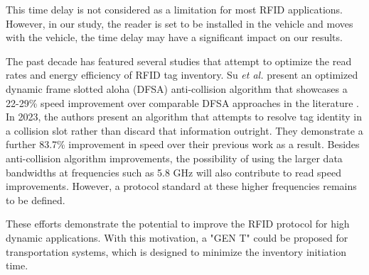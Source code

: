 \documentclass[lettersize,journal]{IEEEtran}
\begin{document}
This time delay is not considered as a limitation for most RFID applications. However, in our study, the reader is set to be installed in the vehicle and moves with the vehicle, the time delay may have a significant impact on our results. 

The past decade has featured several studies that attempt to optimize the read rates and energy efficiency of RFID tag inventory. Su \textit{et al.} present an optimized dynamic frame slotted aloha (DFSA) anti-collision algorithm that showcases a 22-29\% speed improvement over comparable DFSA approaches in the literature \cite{su2020}. In 2023, the authors present an algorithm that attempts to resolve tag identity in a collision slot rather than discard that information outright. They demonstrate a further 83.7\% improvement in speed over their previous work \cite{su2023} as a result. Besides anti-collision algorithm improvements, the possibility of using the larger data bandwidths at frequencies such as 5.8 GHz will also contribute to read speed improvements. However, a protocol standard at these higher frequencies remains to be defined.


These efforts demonstrate the potential to improve the RFID protocol for high dynamic applications. With this motivation, a "GEN T" could be proposed for transportation systems, which is designed to minimize the inventory initiation time.
\end{document}
